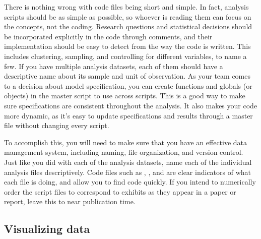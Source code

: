 There is nothing wrong with code files being short and simple.
In fact, analysis scripts should be as simple as possible,
so whoever is reading them can focus on the concepts, not the coding.
Research questions and statistical decisions should be incorporated explicitly in the code through comments,
and their implementation should be easy to detect from the way the code is written.
This includes clustering, sampling, and controlling for different variables, to name a few.
If you have multiple analysis datasets,
each of them should have a descriptive name about its sample and unit of observation.
As your team comes to a decision about model specification,
you can create functions and globals (or objects) in the master script to use across scripts.
This is a good way to make sure specifications are consistent throughout the analysis.
It also makes your code more dynamic,
as it's easy to update specifications and results 
through a master file without changing every script.


To accomplish this, you will need to make sure that you have an effective data management system,
including naming, file organization, and version control.
Just like you did with each of the analysis datasets,
name each of the individual analysis files descriptively.
Code files such as ,
, and 
are clear indicators of what each file is doing, and allow you to find code quickly.
If you intend to numerically order the script files 
to correspond to exhibits as they appear in a paper or report,
leave this to near publication time.


\subsection{Visualizing data}

